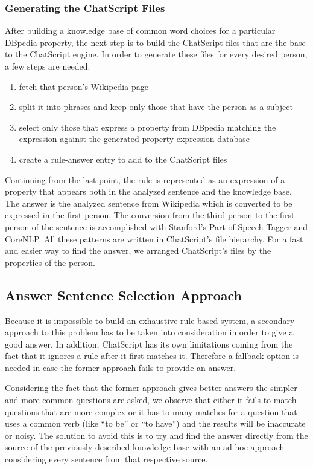 \subsubsection{Generating the ChatScript Files}

After building a knowledge base of common word choices for a particular DBpedia property, the next step is to build the ChatScript files that are the base to the ChatScript engine. In order to generate these files for every desired person, a few steps are needed:

\begin{enumerate}
  \item fetch that person's Wikipedia page
  \item split it into phrases and keep only those that have the person as a subject
  \item select only those that express a property from DBpedia matching the expression against the generated property-expression database
  \item create a rule-answer entry to add to the ChatScript files
\end{enumerate}

Continuing from the last point, the rule is represented as an expression of a property that appears both in the analyzed sentence and the knowledge base. The answer is the analyzed sentence from Wikipedia which is converted to be expressed in the first person. The conversion from the third person to the first person of the sentence is accomplished with Stanford's Part-of-Speech Tagger and CoreNLP. All these patterns are written in ChatScript's file hierarchy. For a fast and easier way to find the answer, we arranged ChatScript's files by the properties of the person. \cite{Bogatu}


\subsection{Answer Sentence Selection Approach}
\label{sub-sec:impl-ca-ass}

Because it is impossible to build an exhaustive rule-based system, a secondary approach to this problem has to be taken into consideration in order to give a good answer. In addition, ChatScript has its own limitations coming from the fact that it ignores a rule after it first matches it. Therefore a fallback option is needed in case the former approach fails to provide an answer.

Considering the fact that the former approach gives better answers the simpler and more common questions are asked, we observe that either it fails to match questions that are more complex or it has to many matches for a question that uses a common verb (like “to be” or “to have”) and the results will be inaccurate or noisy. The solution to avoid this is to try and find the answer directly from the source of the previously described knowledge base with an ad hoc approach considering every sentence from that respective source.

